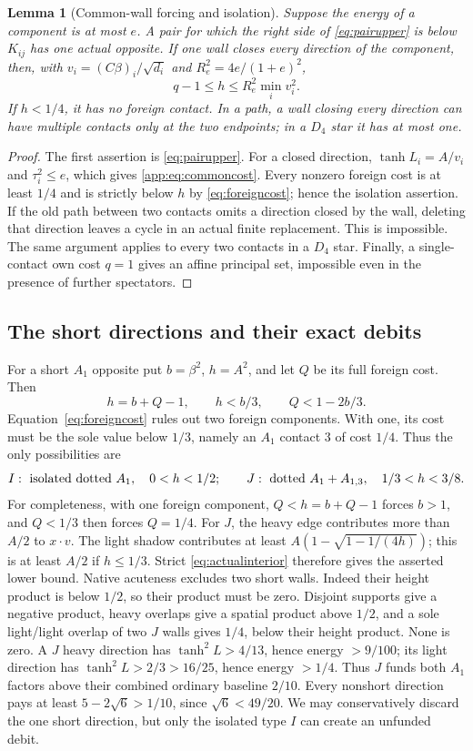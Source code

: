 \documentclass[11pt]{article}
\newtheorem{lemma}[theorem]{Lemma}
\theoremstyle{definition}
\theoremstyle{remark}
\begin{document}
\begin{lemma}[Common-wall forcing and isolation]\label{app:lem:ordinaryforcing}
Suppose the energy of a component is at most $e$. A pair for which
the right side of \eqref{eq:pairupper} is below $K_{ij}$ has one
actual opposite. If one wall closes every direction of the component,
then, with $v_i=(C\beta)_i/\sqrt{d_i}$ and
$R_e^2=4e/(1+e)^2$,
\begin{equation}\label{app:eq:commoncost}
 q-1\le h\le R_e^2\min_i v_i^2.
\end{equation}
If $h<1/4$, it has no foreign contact. In a path, a wall closing
every direction can have multiple contacts only at the two endpoints;
in a $D_4$ star it has at most one.
\end{lemma}
\begin{proof}
The first assertion is \eqref{eq:pairupper}. For a closed direction,
$\tanh L_i=A/v_i$ and $\tau_i^2\le e$, which gives
\eqref{app:eq:commoncost}. Every nonzero foreign cost is at least $1/4$
and is strictly below $h$ by \eqref{eq:foreigncost}; hence the isolation
assertion. If the old path between two contacts omits a direction
closed by the wall, deleting that direction leaves a cycle in an
actual finite replacement. This is impossible. The same argument
applies to every two contacts in a $D_4$ star. Finally, a single-contact
own cost $q=1$ gives an affine principal set, impossible even in the
presence of further spectators.
\end{proof}

\subsection{The short directions and their exact debits}

For a short $A_1$ opposite put $b=\beta^2$, $h=A^2$, and let $Q$
be its full foreign cost. Then
\[
 h=b+Q-1,\qquad h<b/3,\qquad Q<1-2b/3.
\]
Equation~\eqref{eq:foreigncost} rules out two foreign components.
With one, its cost must be the sole value below $1/3$, namely an
$A_1$ contact $3$ of cost $1/4$. Thus the only possibilities are
\[
 I:\ \hbox{isolated dotted }A_1,\quad 0<h<1/2;
 \qquad
 J:\ \hbox{dotted }A_1+A_{1,3},\quad 1/3<h<3/8.
\]
For completeness, with one foreign component,
$Q<h=b+Q-1$ forces $b>1$, and $Q<1/3$ then forces $Q=1/4$.
For $J$, the heavy edge contributes more than $A/2$ to
$x\cdot v$. The light shadow contributes at least
$A(1-\sqrt{1-1/(4h)})$; this is at least $A/2$ if $h\le1/3$.
Strict \eqref{eq:actualinterior} therefore gives the asserted lower bound.
Native acuteness excludes two short walls. Indeed their height
product is below $1/2$, so their product must be zero. Disjoint
supports give a negative product, heavy overlaps give a spatial
product above $1/2$, and a sole light/light overlap of two $J$ walls
gives $1/4$, below their height product. None is zero. A $J$ heavy
direction has $\tanh^2L>4/13$, hence energy $>9/100$; its light
direction has $\tanh^2L>2/3>16/25$, hence energy $>1/4$.
Thus $J$ funds both $A_1$ factors above their combined ordinary
baseline $2/10$. Every nonshort direction pays at least
$5-2\sqrt6>1/10$, since $\sqrt6<49/20$. We may conservatively
discard the one short direction, but only the isolated type $I$
can create an unfunded debit.
\end{document}
